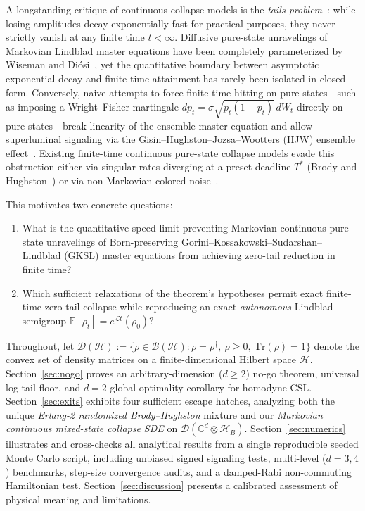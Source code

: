 \documentclass[aps,pra,10pt,twocolumn,superscriptaddress,amsmath,amssymb,floatfix]{revtex4-2}
\newcommand{\Tr}{\mathrm{Tr}}
\newcommand{\E}{\mathbb{E}}
\begin{document}
A longstanding critique of continuous collapse models is the \emph{tails problem}~\cite{BassiGhirardi2003}: while losing amplitudes decay exponentially fast for practical purposes, they never strictly vanish at any finite time $t < \infty$. Diffusive pure-state unravelings of Markovian Lindblad master equations have been completely parameterized by Wiseman and Di\'osi~\cite{WisemanDiosi2001}, yet the quantitative boundary between asymptotic exponential decay and finite-time attainment has rarely been isolated in closed form. Conversely, naive attempts to force finite-time hitting on pure states---such as imposing a Wright--Fisher martingale $dp_t = \sigma\sqrt{p_t(1-p_t)}\,dW_t$ directly on pure states---break linearity of the ensemble master equation and allow superluminal signaling via the Gisin--Hughston--Jozsa--Wootters (HJW) ensemble effect~\cite{Gisin1989,HJW1993}. Existing finite-time continuous pure-state collapse models evade this obstruction either via singular rates diverging at a preset deadline $T^*$ (Brody and Hughston~\cite{BrodyHughston2005,BrodyHughston2006}) or via non-Markovian colored noise~\cite{Mertens2021}.

This motivates two concrete questions:
\begin{enumerate}
\item What is the quantitative speed limit preventing Markovian continuous pure-state unravelings of Born-preserving Gorini--Kossakowski--Sudarshan--Lindblad (GKSL) master equations from achieving zero-tail reduction in finite time?
\item Which sufficient relaxations of the theorem's hypotheses permit exact finite-time zero-tail collapse while reproducing an exact \emph{autonomous} Lindblad semigroup $\E[\rho_t] = e^{\mathcal{L}t}(\rho_0)$?
\end{enumerate}

Throughout, let $\mathcal{D}(\mathcal{H}) := \{\rho \in \mathcal{B}(\mathcal{H}) : \rho = \rho^\dagger,\ \rho \ge 0,\ \Tr(\rho)=1\}$ denote the convex set of density matrices on a finite-dimensional Hilbert space $\mathcal{H}$. Section~\ref{sec:nogo} proves an arbitrary-dimension ($d\ge 2$) no-go theorem, universal log-tail floor, and $d=2$ global optimality corollary for homodyne CSL. Section~\ref{sec:exits} exhibits four sufficient escape hatches, analyzing both the unique \emph{Erlang-2 randomized Brody--Hughston} mixture and our \emph{Markovian continuous mixed-state collapse SDE} on $\mathcal{D}(\mathbb{C}^d \otimes \mathcal{H}_B)$. Section~\ref{sec:numerics} illustrates and cross-checks all analytical results from a single reproducible seeded Monte Carlo script, including unbiased signed signaling tests, multi-level ($d=3,4$) benchmarks, step-size convergence audits, and a damped-Rabi non-commuting Hamiltonian test. Section~\ref{sec:discussion} presents a calibrated assessment of physical meaning and limitations.
\end{document}

